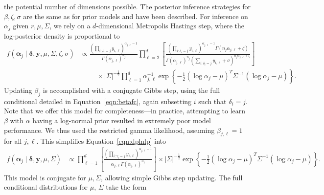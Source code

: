   the potential number of dimensions possible.  The posterior inference strategies for $\beta,\zeta,\sigma$
  are the same as for prior models and have been described.  For inference on $\alpha_j$ given
  $r, \mu,\Sigma$, we rely on a $d$-dimensional Metropolis Hastings step, where the log-posterior
  density is proportional to
  \begin{equation}
    \label{eqn:dplnlp}
    \begin{aligned}
    f(\bm{\alpha}_j\mid\bm{\delta},\bm{y},\mu,\Sigma,\zeta,\sigma) &\propto
    \frac{\left(\prod_{i:\delta_i = j}y_{i,\ell}\right)^{\alpha_{j,\ell} - 1}}{\Gamma(\alpha_{j,\ell})^{n_j}}
        \prod_{\ell = 2}^d\left[\frac{\left(\prod_{i:\delta_i = j}y_{i,\ell}\right)^{\alpha_{j,\ell} - 1}
        \Gamma(n_j\alpha_{j,\ell} + \zeta)}{\Gamma(\alpha_{j,\ell})^{n_j}\left(\sum_{i:\delta_i = j}y_{i,\ell}
        + \sigma\right)^{n_j\alpha_{j,\ell} + \zeta}}\right]\\
        &\hspace{1cm}\times
        \lvert \Sigma\rvert^{-\frac{1}{2}}\prod_{\ell = 1}^d\alpha_{j,\ell}^{-1}\exp\left\lbrace
          -\frac{1}{2}(\log\alpha_j - \mu)^T\Sigma^{-1}(\log\alpha_j - \mu)\right\rbrace.
    \end{aligned}
  \end{equation}
  Updating $\beta_j$ is accomplished with a conjugate Gibbs step, using the full conditional detailed
  in Equation~\ref{eqn:betafc}, again subsetting $i$ such that $\delta_i = j$.  Note that we offer this
  model for completeness---in practice, attempting to learn $\beta$ with $\alpha$ having a log-normal
  prior resulted in extremely poor model performance.  We thus used the restricted gamma likelihood,
  assuming $\beta_{j,\ell} = 1$ for all $j,\ell$.  This simplifies Equation~\ref{eqn:dplnlp} into
  \begin{equation}
    \label{eqn:dplnlpr}
    \begin{aligned}
    f(\bm{\alpha}_j\mid\bm{\delta},\bm{y},\mu,\Sigma) &\propto
    \prod_{\ell = 1}^d\left[\frac{\left(\prod_{i:\gamma_i = j}
        y_{i,\ell}\right)^{\alpha_{j,\ell} - 1}}{\alpha_{j,\ell}\Gamma(\alpha_{j,\ell})^{n_j}} \right]
        \times\lvert\Sigma\rvert^{-\frac{1}{2}}
      \exp\left\lbrace-\frac{1}{2}(\log\alpha_j - \mu)^T\Sigma^{-1}(\log\alpha_j - \mu)\right\rbrace.
    \end{aligned}
  \end{equation}
  This model is conjugate for $\mu,\Sigma$, allowing simple Gibbs step updating.  The full
    conditional distributions for $\mu$, $\Sigma$ take the form

